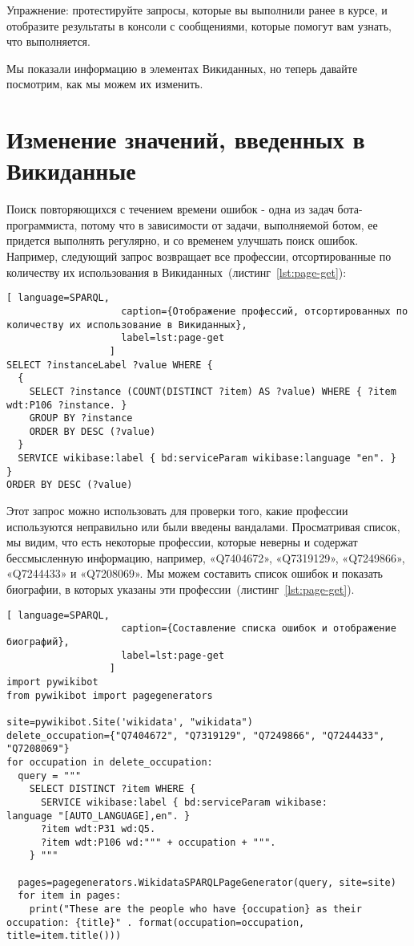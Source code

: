 Упражнение: протестируйте запросы, которые вы выполнили ранее в курсе, и отобразите результаты в консоли с сообщениями, которые помогут вам узнать, что выполняется.

Мы показали информацию в элементах Викиданных, но теперь давайте посмотрим, как мы можем их изменить.

\section{Изменение значений, введенных в Викиданные}
\label{sec:modifying the values entered in Wikidata}

Поиск повторяющихся с течением времени ошибок - одна из задач бота-программиста, потому что в зависимости от задачи, выполняемой ботом, ее придется выполнять регулярно, и со временем улучшать поиск ошибок. Например, следующий запрос возвращает все профессии, отсортированные по количеству их использования в Викиданных~(листинг~\ref{lst:page-get}):

\begin{lstlisting}[ language=SPARQL,
                    caption={Отображение профессий, отсортированных по количеству их использование в Викиданных},
                    label=lst:page-get
                  ]
SELECT ?instanceLabel ?value WHERE {
  {
    SELECT ?instance (COUNT(DISTINCT ?item) AS ?value) WHERE { ?item
wdt:P106 ?instance. }
    GROUP BY ?instance
    ORDER BY DESC (?value)
  }
  SERVICE wikibase:label { bd:serviceParam wikibase:language "en". }
}
ORDER BY DESC (?value)
\end{lstlisting} 

Этот запрос можно использовать для проверки того, какие профессии используются неправильно или были введены вандалами. Просматривая список, мы видим, что есть некоторые профессии, которые неверны и содержат бессмысленную информацию, например, «Q7404672», «Q7319129», «Q7249866», «Q7244433» и «Q7208069». Мы можем составить список ошибок и показать биографии, в которых указаны эти профессии~(листинг~\ref{lst:page-get}).

\begin{lstlisting}[ language=SPARQL,
                    caption={Составление списка ошибок и отображение биографий},
                    label=lst:page-get
                  ]
import pywikibot
from pywikibot import pagegenerators

site=pywikibot.Site('wikidata', "wikidata")
delete_occupation={"Q7404672", "Q7319129", "Q7249866", "Q7244433", 
"Q7208069"}
for occupation in delete_occupation:
  query = """
    SELECT DISTINCT ?item WHERE {
      SERVICE wikibase:label { bd:serviceParam wikibase:
language "[AUTO_LANGUAGE],en". }
      ?item wdt:P31 wd:Q5.
      ?item wdt:P106 wd:""" + occupation + """.
    } """

  pages=pagegenerators.WikidataSPARQLPageGenerator(query, site=site)
  for item in pages:
    print("These are the people who have {occupation} as their 
occupation: {title}" . format(occupation=occupation, 
title=item.title()))
\end{lstlisting} 

